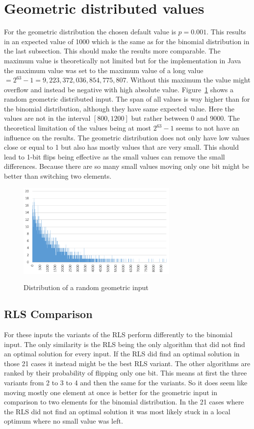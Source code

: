 \section{Geometric distributed values}
For the geometric distribution the chosen default value is $p=0.001$.
This results in an expected value of 1000 which is the same as for the binomial distribution in the last subsection.
This should make the results more comparable.
The maximum value is theoretically not limited but for the implementation in Java the maximum value was set to the maximum value of a long value $= 2^{63}-1 = 9,223,372,036,854,775,807$.
Without this maximum the value might overflow and instead be negative with high absolute value.
Figure~\ref{fig:geoDistExample} shows a random geometric distributed input.
The span of all values is way higher than for the binomial distribution, although they have same expected value.
Here the values are not in the interval $[800,1200]$ but rather between 0 and 9000.
The theoretical limitation of the values being at most $2^{63}-1$ seems to not have an influence on the results.
The geometric distribution does not only have low values close or equal to 1 but also has mostly values that are very small.
This should lead to 1-bit flips being effective as the small values can remove the small differences.
Because there are so many small values moving only one bit might be better than switching two elements.
\begin{figure}[h]
      \caption{Distribution of a random geometric input}
      \centering
      \includegraphics[width=0.7\textwidth]{figures/images/numberGenerator/geometricDistributionForp0_001.png}\label{fig:geoDistExample}
\end{figure}
\subsection{RLS Comparison}

For these inputs the variants of the RLS perform differently to the binomial input.
The only similarity is the RLS being the only algorithm that did not find an optimal solution for every input.
If the RLS did find an optimal solution in those 21 cases it instead might be the best RLS variant.
The other algorithms are ranked by their probability of flipping only one bit.
This means at first the three \RLSR[s] variants from 2 to 3 to 4 and then the same for the \RLSN[b] variants.
So it does seem like moving mostly one element at once is better for the geometric input in comparison to two elements for the binomial distribution.
In the 21 cases where the RLS did not find an optimal solution it was most likely stuck in a local optimum where no small value was left.

